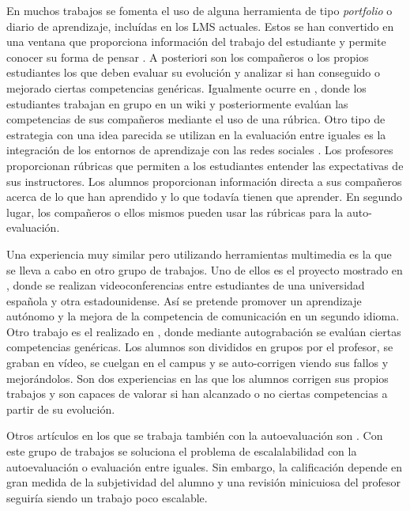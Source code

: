 En muchos trabajos se fomenta el uso de alguna herramienta de tipo \emph{portfolio} o diario de aprendizaje, incluídas en los LMS actuales. Estos se han convertido en una ventana que proporciona información del trabajo del estudiante y permite conocer su forma de pensar \cite{Palomares:2011,Gil:2011}. A posteriori son los compañeros o los propios estudiantes los que deben evaluar su evolución y analizar si han conseguido o mejorado ciertas competencias genéricas. Igualmente ocurre en \cite{Lim:2011}, donde los estudiantes trabajan en grupo en un wiki y posteriormente evalúan las competencias de sus compañeros mediante el uso de una rúbrica. Otro tipo de estrategia con una idea parecida se utilizan en la evaluación entre iguales es la integración de los entornos de aprendizaje con las redes sociales \cite{Piedra:2010,McLoughlin:2006,Shih:2011}. Los profesores proporcionan rúbricas que permiten a los estudiantes entender las expectativas de sus instructores. Los alumnos proporcionan información directa a sus compañeros acerca de lo que han aprendido y lo que todavía tienen que aprender. En segundo lugar, los compañeros o ellos mismos pueden usar las rúbricas para la auto-evaluación. 

Una experiencia muy similar pero utilizando herramientas multimedia es la que se lleva a cabo en otro grupo de trabajos. Uno de ellos es el proyecto mostrado en \cite{Martin-Cuadrado:2013}, donde se realizan videoconferencias entre estudiantes de una universidad española y otra estadounidense. Así se pretende promover un aprendizaje autónomo y la mejora de la competencia de comunicación en un segundo idioma. Otro trabajo es el realizado en \cite{Masip-Alvarez:2013}, donde mediante autograbación se evalúan ciertas competencias genéricas. Los alumnos son divididos en grupos por el profesor, se graban en vídeo, se cuelgan en el campus y se auto-corrigen viendo sus fallos y mejorándolos. Son dos experiencias en las que los alumnos corrigen sus propios trabajos y son capaces de valorar si han alcanzado o no ciertas competencias a partir de su evolución.

Otros artículos en los que se trabaja también con la autoevaluación son \cite{Colomo-Palacios:2013,Liao:2013,McMahon:2007,Murdoch-Eaton:2012,Chebil:2012,Cardona:2013}. Con este grupo de trabajos se soluciona el problema de escalalabilidad con la autoevaluación o evaluación entre iguales. Sin embargo, la calificación depende en gran medida de la subjetividad del alumno y una revisión minicuiosa del profesor seguiría siendo un trabajo poco escalable. 

